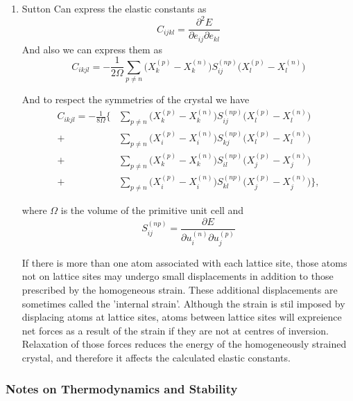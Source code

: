 \documentclass[11pt]{article}
\begin{document}
\begin{enumerate}
\item Sutton
\label{sec:org2323d79}
Can express the elastic constants as 
\[ C_{ijkl} = \frac{\partial^2 E}{\partial e_{ij}\partial e_{kl}} \]
And also we can express them as 
\[ C_{ikjl} = -\frac{1}{2\Omega} \sum_{p\neq n} \big( X_k^{(p)} - X_k^{(n)} \big) S_{ij}^{(np)}  \big( X_l^{(p)} - X_l^{(n)}  \big)  \]

And to respect the symmetries of the crystal we have 
\begin{align}
 C_{ikjl} = -\frac{1}{8\Omega}  \Big\{ 
    &\sum_{p\neq n}\big( X_k^{(p)} - X_k^{(n)} \big) S_{ij}^{(np)}  \big( X_l^{(p)} - X_l^{(n)}  \big) \\
  + &\sum_{p\neq n}\big( X_i^{(p)} - X_i^{(n)} \big) S_{kj}^{(np)}  \big( X_l^{(p)} - X_l^{(n)}  \big) \\
  + &\sum_{p\neq n}\big( X_k^{(p)} - X_k^{(n)} \big) S_{il}^{(np)}  \big( X_j^{(p)} - X_j^{(n)}  \big) \\
  + &\sum_{p\neq n}\big( X_i^{(p)} - X_i^{(n)} \big) S_{kl}^{(np)}  \big( X_j^{(p)} - X_j^{(n)}  \big)  \Big\},
\end{align}

where \(\Omega\) is the volume of the primitive unit cell and
\[ S_{ij}^{(np)} =  \frac{\partial E}{\partial u_i^{(n)} \partial u_j^{(p)} } \]

If there is more than one atom associated with each lattice site, 
those atoms not on lattice sites may undergo small displacements in addition to those prescribed by the homogeneous strain.
These additional displacements are sometimes called the 'internal strain'. 
Although the strain is stil imposed by displacing atoms at lattice sites, atoms between lattice sites will expreience 
net forces as a result of the strain if they are not at centres of inversion. 
Relaxation of those forces reduces the energy of the homogeneously strained crystal, and therefore it affects the calculated elastic constants.
\end{enumerate}
\subsubsection{Notes on Thermodynamics and Stability}
\label{sec:org9f5a904}
\end{document}

